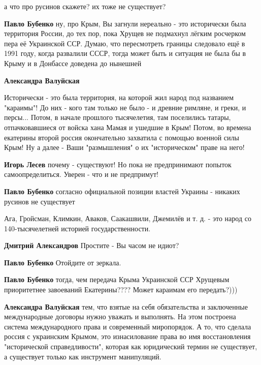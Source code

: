 \begin{itemize}
\begin{itemize} %
а что про русинов скажете? их тоже не существует?

\textbf{Павло Бубенко} ну, про Крым, Вы загнули нереально - это исторически была территория России, до тех пор, пока Хрущев не подмахнул лёгким росчерком пера её Украинской ССР. Думаю, что пересмотреть границы следовало ещё в 1991 году, когда развалили СССР, тогда может быть и ситуация не была бы в Крыму и в Донбассе доведена до нынешней

\textbf{Александра Валуйская} 

Исторически - это была территория, на которой жил народ под названием
"караимы"! До них - кого там только не было - и древние римляне, и греки, и
персы... Потом, в начале прошлого тысячелетия, там поселились татары,
отпачковавшиеся от войска хана Мамая и ушедшие в Крым! Потом, во времена
екатерины второй россия окончательно захватила с помощью военной силы Крым! Ну
а далее - Ваши "размышления" о их "историческом" праве на него!

\textbf{Игорь Лесев} почему - существуют! Но пока не предпринимают попыток самоопределиться. Уверен - что и не предпримут!

\textbf{Павло Бубенко} согласно официальной позиции властей Украины - никаких русинов не существует

Ага, Гройсман, Климкин, Аваков, Саакашвили, Джемилёв и т. д. - это народ со 140-тысячелетней историей государственности.

\textbf{Дмитрий Александров} Простите - Вы часом не идиот?

\textbf{Павло Бубенко} Отойдите от зеркала.

\textbf{Павло Бубенко} тогда, чем передача Крыма Украинской ССР Хрущевым приоритетнее завоеваний Екатерины???? Может караимам его передать?)))

\textbf{Александра Валуйская} тем, что взятые на себя обязательства и заключенные международные договоры нужно уважать и выполнять. На этом построена система международного права и современный миропорядок. А то, что сделала россия с украинским Крымом, это изнасилование права во имя восстановления "исторической справедливости", которая как юридический термин не существует, а существует только как инструмент манипуляций.


\end{itemize}
\end{itemize}
